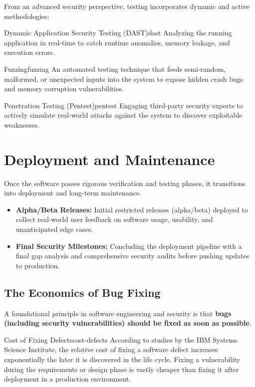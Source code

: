 \noindent From an advanced security perspective, testing incorporates dynamic and active methodologies:

\begin{concept}{Dynamic Application Security Testing (DAST)}{dast}
    Analyzing the running application in real-time to catch runtime anomalies, memory leakage, and execution errors.
\end{concept}

\begin{concept}{Fuzzing}{fuzzing}
    An automated testing technique that feeds semi-random, malformed, or unexpected inputs into the system to expose hidden crash bugs and memory corruption vulnerabilities.
\end{concept}

\begin{concept}{Penetration Testing (Pentest)}{pentest}
    Engaging third-party security experts to actively simulate real-world attacks against the system to discover exploitable weaknesses.
\end{concept}

\section{Deployment and Maintenance}
Once the software passes rigorous verification and testing phases, it transitions into deployment and long-term maintenance. 

\begin{itemize}
    \item \textbf{Alpha/Beta Releases:} Initial restricted releases (alpha/beta) deployed to collect real-world user feedback on software usage, usability, and unanticipated edge cases.
    \item \textbf{Final Security Milestones:} Concluding the deployment pipeline with a final gap analysis and comprehensive security audits before pushing updates to production.
\end{itemize}

\subsection{The Economics of Bug Fixing}
A foundational principle in software engineering and security is that \textbf{bugs (including security vulnerabilities) should be fixed as soon as possible}. 

\begin{observation}{Cost of Fixing Defects}{cost-defects}
    According to studies by the IBM Systems Science Institute, the relative cost of fixing a software defect increases exponentially the later it is discovered in the life cycle. Fixing a vulnerability during the requirements or design phase is vastly cheaper than fixing it after deployment in a production environment. 
\end{observation}

